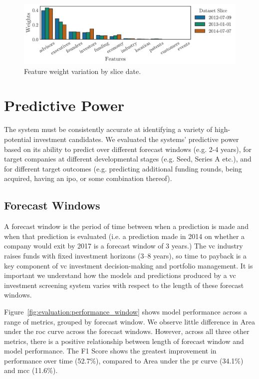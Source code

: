 \documentclass[../thesis/thesis.tex]{subfiles}
\begin{document}
\begin{figure}[!htb]
    \centering
    \includegraphics[width=\textwidth]{../figures/evaluation/features_slice}
    \caption[Feature weight variation by slice date]{Feature weight variation by slice date.}
    \label{fig:evaluation:features_slice}
\end{figure}

\section{Predictive Power}

The system must be consistently accurate at identifying a variety of high-potential investment candidates. We evaluated the systems' predictive power based on its ability to predict over different forecast windows (e.g. 2-4 years), for target companies at different developmental stages (e.g. Seed, Series A etc.), and for different target outcomes (e.g. predicting additional funding rounds, being acquired, having an \gls{ipo}, or some combination thereof).

\subsection{Forecast Windows}

A forecast window is the period of time between when a prediction is made and when that prediction is evaluated (i.e. a prediction made in 2014 on whether a company would exit by 2017 is a forecast window of 3 years.) The \gls{vc} industry raises funds with fixed investment horizons (3--8 years), so time to payback is a key component of \gls{vc} investment decision-making and portfolio management. It is important we understand how the models and predictions produced by a \gls{vc} investment screening system varies with respect to the length of these forecast windows.

Figure~\ref{fig:evaluation:performance_window} shows model performance across a range of metrics, grouped by forecast window. We observe little difference in Area under the \gls{roc} curve across the forecast windows. However, across all three other metrics, there is a positive relationship between length of forecast window and model performance. The F1 Score shows the greatest improvement in performance over time (52.7\%), compared to Area under the \gls{pr} curve (34.1\%) and \gls{mcc} (11.6\%).
\end{document}
